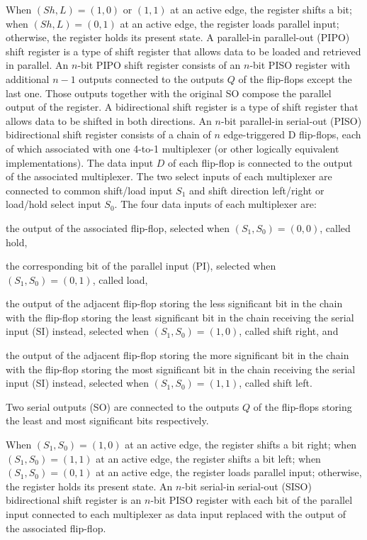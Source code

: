 \documentclass[a4paper,12pt]{report}
\begin{document}
When $(Sh,L)=(1,0)$ or $(1,1)$ at an active edge, the register shifts a bit; when $(Sh,L)=(0,1)$ at an active edge, the register loads parallel input; otherwise, the register holds its present state.
A parallel-in parallel-out (PIPO) shift register is a type of shift register that allows data to be loaded and retrieved in parallel. An $n$-bit PIPO shift register consists of an $n$-bit PISO register with additional $n-1$ outputs connected to the outputs $Q$ of the flip-flops except the last one. Those outputs together with the original SO compose the parallel output of the register.
A bidirectional shift register is a type of shift register that allows data to be shifted in both directions. An $n$-bit parallel-in serial-out (PISO) bidirectional shift register consists of a chain of $n$ edge-triggered D flip-flops, each of which associated with one 4-to-1 multiplexer (or other logically equivalent implementations). The data input $D$ of each flip-flop is connected to the output of the associated multiplexer. The two select inputs of each multiplexer are connected to common shift/load input $S_1$ and shift direction left/right or load/hold select input $S_0$. The four data inputs of each multiplexer are:
\bit
\item the output of the associated flip-flop, selected when $(S_1,S_0)=(0,0)$, called hold,
\item the corresponding bit of the parallel input (PI), selected when $(S_1,S_0)=(0,1)$, called load,
\item the output of the adjacent flip-flop storing the less significant bit in the chain with the flip-flop storing the least significant bit in the chain receiving the serial input (SI) instead, selected when $(S_1,S_0)=(1,0)$, called shift right, and
\item the output of the adjacent flip-flop storing the more significant bit in the chain with the flip-flop storing the most significant bit in the chain receiving the serial input (SI) instead, selected when $(S_1,S_0)=(1,1)$, called shift left.
\eit

Two serial outputs (SO) are connected to the outputs $Q$ of the flip-flops storing the least and most significant bits respectively.

When $(S_1,S_0)=(1,0)$ at an active edge, the register shifts a bit right; when $(S_1,S_0)=(1,1)$ at an active edge, the register shifts a bit left; when $(S_1,S_0)=(0,1)$ at an active edge, the register loads parallel input; otherwise, the register holds its present state.
An $n$-bit serial-in serial-out (SISO) bidirectional shift register is an $n$-bit PISO register with each bit of the parallel input connected to each multiplexer as data input replaced with the output of the associated flip-flop.
\end{document}
